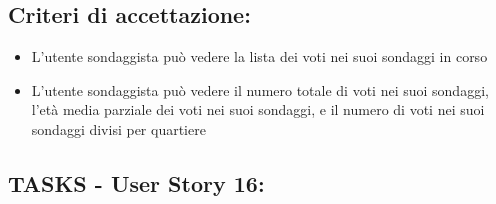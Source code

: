     \subsection*{Criteri di accettazione:}  
    \begin{itemize}  
        \item L'utente sondaggista può vedere la lista dei voti nei suoi sondaggi in corso
        \item L'utente sondaggista può vedere il numero totale di voti nei suoi sondaggi, l'età media parziale dei voti nei suoi sondaggi, e il numero di voti nei suoi sondaggi divisi per quartiere
    \end{itemize}  
    \subsection*{TASKS - User Story 16:}  
